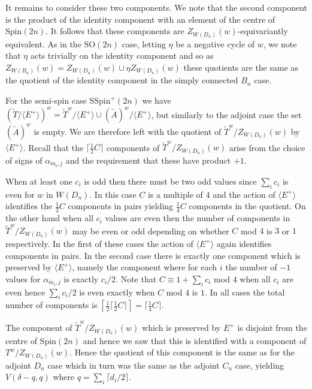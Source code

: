 \documentclass[11pt,a4paper]{article}
\def\SSpin{\mathrm{SSpin}}
\def\Spin{\mathrm{Spin}}
\def\SO{\mathrm{SO}}
\def\SSpin{\mathrm{SSpin}}
\def\Atilde{(\widetilde{A})}
\def\mbar{\overline{m}}
\def\mbar{\overline{m}}
\def\coveringtorus{\tilde{T}}
\begin{document}
It remains to consider these two components. We note that the second component is the product of the identity component with an element of the centre of $\Spin(2n)$. It follows that these components are $Z_{W(D_n)}(w)$-equivariantly equivalent.  As in the $\SO(2n)$ case, letting $\eta$ be a negative cycle of $w$, we note that $\eta$ acts trivially on the identity component and so as $Z_{W(B_n)}(w)=Z_{W(D_n)}(w) \cup \eta Z_{W(D_n)}(w)$ these quotients are the same as the quotient of the identity component in the simply connected $B_n$ case.


For the semi-spin case $\SSpin^+(2n)$ we have $(\coveringtorus/\langle E^+\rangle)^w=\coveringtorus^w/\langle E^+\rangle \cup \Atilde^w/\langle E^+\rangle$, but similarly to the adjoint case the set $\Atilde^w$ is empty. We are therefore left with the quotient of $\coveringtorus^w/Z_{W(D_n)}(w)$ by $\langle E^+ \rangle$.   Recall that the $\lceil \frac 12C\rceil$ components of $\coveringtorus^w/Z_{W(D_n)}(w)$ arise from the choice of signs of $\alpha_{\mbar_i,j}$ and the requirement that these have product $+1$.

When at least one $c_i$ is odd then there must be two odd values since $\sum_i c_i$ is even for $w$ in $W(D_n)$. In this case $C$ is a multiple of $4$ and the action of $\langle E^+\rangle$ identifies the $\frac 12 C$ components in pairs yielding $\frac 14C$ components in the quotient. On the other hand when all $c_i$ values are even then the number of components in $\coveringtorus^w/Z_{W(D_n)}(w)$ may be even or odd depending on whether $C$ mod $4$ is $3$ or $1$ respectively. In the first of these cases the action of $\langle E^+\rangle$ again identifies components in pairs. In the second case there is exactly one component which is preserved by $\langle E^+\rangle$, namely the component where for each $i$ the number of $-1$ values for $\alpha_{\mbar_i,j}$ is exactly $c_i/2$.  Note that $C\equiv 1+\sum_i c_i$ mod $4$ when all $c_i$ are even hence $\sum_i c_i/2$ is even exactly when $C$ mod $4$ is $1$. In all cases the total number of components is $\left\lceil \frac 12\lceil\frac 12C\rceil\right\rceil=\lceil\frac 14C\rceil$.

The component of $\coveringtorus^w/Z_{W(D_n)}(w)$ which is preserved by $E^+$ is disjoint from the centre of $\Spin(2n)$ and hence we saw that this is identified with a component of $T^w/Z_{W(D_n)}(w)$. Hence the quotient of this component is the same as for the adjoint $D_n$ case which in turn was the same as the adjoint $C_n$ case, yielding $V(\delta-q,q)$ where $q=\sum_i\lceil d_i/2\rceil$.
\end{document}
